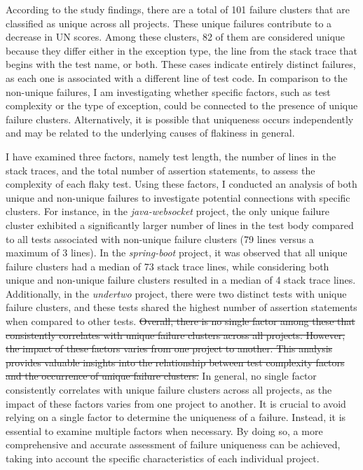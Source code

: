According to the study findings, there are a total of 101 failure clusters that are classified as unique across all projects. These unique failures contribute to a decrease in UN scores. Among these clusters, 82 of them are considered unique because they differ either in the exception type, the line from the stack trace that begins with the test name, or both. These cases indicate entirely distinct failures, as each one is associated with a different line of test code. In comparison to the non-unique failures, I am investigating whether specific factors, such as test complexity or the type of exception, could be connected to the presence of unique failure clusters. Alternatively, it is possible that uniqueness occurs independently and may be related to the underlying causes of flakiness in general.

I have examined three factors, namely test length, the number of lines in the stack traces, and the total number of assertion statements, to assess the complexity of each flaky test. Using these factors, I conducted an analysis of both unique and non-unique failures to investigate potential connections with specific clusters.
For instance, in the \emph{java-websocket} project, the only unique failure cluster exhibited a significantly larger number of lines in the test body compared to all tests associated with non-unique failure clusters (79 lines versus a maximum of 3 lines). In the \emph{spring-boot} project, it was observed that all unique failure clusters had a median of 73 stack trace lines, while considering both unique and non-unique failure clusters resulted in a median of 4 stack trace lines. Additionally, in the \emph{undertwo} project, there were two distinct tests with unique failure clusters, and these tests shared the highest number of assertion statements when compared to other tests.
\sout{Overall, there is no single factor among these that consistently correlates with unique failure clusters across all projects. However, the impact of these factors varies from one project to another. This analysis provides valuable insights into the relationship between test complexity factors and the occurrence of unique failure clusters.}
In general, no single factor consistently correlates with unique failure clusters across all projects, as the impact of these factors varies from one project to another. It is crucial to avoid relying on a single factor to determine the uniqueness of a failure. Instead, it is essential to examine multiple factors when necessary. By doing so, a more comprehensive and accurate assessment of failure uniqueness can be achieved, taking into account the specific characteristics of each individual project.


